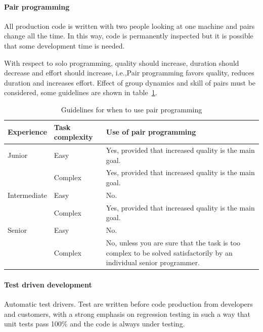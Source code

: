 \paragraph{Pair programming}
All production code is written with two people looking at one machine and pairs change all the time. In this way, code is permanently inspected but it is possible that some development time is needed.

With respect to solo programming, quality should increase, duration should decrease and effort should increase, i.e.,\@ Pair programming favors quality, reduces duration and increases effort. Effect of group dynamics and skill of pairs must be considered, some guidelines are shown in table~\ref{tab:pp_guidelines}.

\begin{table}
\centering
\small
\begin{tabularx}{0.95 \textwidth}{|l|l|X|}
\hline
\textbf{Experience} & \textbf{Task complexity} & \textbf{Use of pair programming} \\
\hline
Junior & Easy & Yes, provided that increased quality is the main goal. \\
\cline{2-3}
 & Complex & Yes, provided that increased quality is the main goal. \\
\hline
Intermediate & Easy & No. \\
\cline{2-3}
 & Complex & Yes, provided that increased quality is the main goal. \\
\hline
Senior & Easy & No. \\
\cline{2-3}
 & Complex & No, unless you are sure that the task is too complex to be solved satisfactorily by an individual senior programmer. \\
\hline
\end{tabularx}
\caption{Guidelines for when to use pair programming}
\label{tab:pp_guidelines}
\end{table}

\paragraph{Test driven development}
Automatic test drivers. Test are written before code production from developers and customers, with a strong emphasis on regression testing in such a way that unit tests pass 100\% and the code is always under testing.

